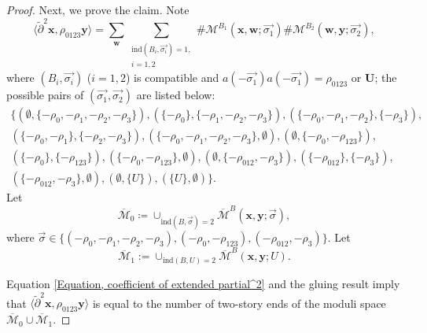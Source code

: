 \documentclass{amsart}
\theoremstyle{definition}
\theoremstyle{remark}
\numberwithin{equation}{section}
\numberwithin{equation}{section} \makeatletter
\begin{document}
\begin{proof}
Next, we prove the claim. Note
\begin{equation}\label{Equation, coefficient of extended partial^2}
\langle\tilde{\partial}^2\bm{x}, \rho_{0123}\bm{y}\rangle=\sum_{\bm{w}}\sum_{\substack{\text{ind}(B_i,\overrightarrow{\sigma_i})=1,\\ i=1,2}} \#\mathcal{M}^{B_1}(\bm{x},\bm{w};\overrightarrow{\sigma_1})\#\mathcal{M}^{B_2}(\bm{w},\bm{y};\overrightarrow{\sigma_2}),
\end{equation}
where $(B_i,\overrightarrow{\sigma_i})$ ($i=1,2$) is compatible and $a(-\overrightarrow{\sigma_1})a(-\overrightarrow{\sigma_1})=\rho_{0123}$ or $\bm{U}$; the possible pairs of $(\overrightarrow{\sigma_1},\overrightarrow{\sigma_2})$ are listed below:
\begin{align*}
\bigg\{(\emptyset,\{-\rho_0,-\rho_1,-\rho_2,-\rho_3\}),(\{-\rho_0\},\{-\rho_1,-\rho_2,-\rho_3\}),(\{-\rho_0,-\rho_1,-\rho_2\},\{-\rho_3\}),\\
(\{-\rho_0,-\rho_1\},\{-\rho_2,-\rho_3\}),(\{-\rho_0,-\rho_1,-\rho_2,-\rho_3\},\emptyset),(\emptyset,\{-\rho_0,-\rho_{123}\}),\\(\{-\rho_0\},\{-\rho_{123}\}),(\{-\rho_0,-\rho_{123}\},\emptyset),(\emptyset,\{-\rho_{012},-\rho_{3}\}),(\{-\rho_{012}\},\{-\rho_{3}\}),\\(\{-\rho_{012},-\rho_{3}\},\emptyset),(\emptyset,\{U\}),(\{U\},\emptyset)\bigg\}.
\end{align*}
Let $$\overline{\mathcal{M}}_0\coloneqq\cup_{\text{ind}(B,\overrightarrow{\sigma})=2}\overline{\mathcal{M}}^B(\bm{x},\bm{y};\overrightarrow{\sigma}),$$ where $\overrightarrow{\sigma}\in \{(-\rho_0,-\rho_1,-\rho_2,-\rho_3),(-\rho_0,-\rho_{123}),(-\rho_{012},-\rho_{3})\}$. Let $$\overline{\mathcal{M}}_1:=\cup_{\text{ind}(B,U)=2}\overline{\mathcal{M}}^B(\bm{x},\bm{y};U).$$

Equation \ref{Equation, coefficient of extended partial^2} and the gluing result imply that $\langle\tilde{\partial}^2\bm{x}, \rho_{0123}\bm{y}\rangle$ is equal to the number of two-story ends of the moduli space $\overline{\mathcal{M}}_0\cup \overline{\mathcal{M}}_1$. 


\end{proof}
\end{document}
